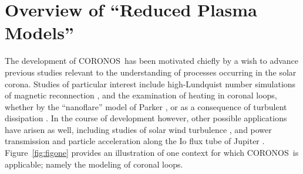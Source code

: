 \documentclass[12pt]{memoir}
\newcommand{\coronos}{\textsf{CORONOS}}
\begin{document}
\section{Overview of ``Reduced Plasma Models''}
\label{sec:overview}
%
The development of \coronos\ has been motivated chiefly by a wish to advance
previous studies relevant to the understanding of processes occurring in the
solar corona. Studies of particular interest include high-Lundquist number
simulations of magnetic reconnection \citep{NgRagunathan2011, Tassietal2010},
and the examination of heating in coronal loops, whether by the ``nanoflare''
model of Parker \citep{Ngetal2012}, or as a consequence of turbulent
dissipation \citep{Ngetal2017}. In the course of development however, other
possible applications have arisen as well, including studies of solar wind
turbulence \citep{PerezChandran2013}, and power transmission and particle
acceleration along the Io flux tube of Jupiter \citep{Hessetal2010}.
Figure~\ref{fig:figone} provides an illustration of one context for which
\coronos\ is applicable; namely the modeling of coronal loops.
%
%
\end{document}

